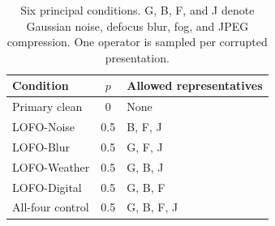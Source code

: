\begin{table}[!htbp]
\caption{Six principal conditions. G, B, F, and J denote Gaussian noise, defocus blur, fog, and JPEG compression. One operator is sampled per corrupted presentation.}
\label{tab:conditions}
\centering
\setlength{\tabcolsep}{8pt}
\begin{tabular}{lcl}
\toprule
Condition & $p$ & Allowed representatives \\
\midrule
Primary clean & 0 & None \\
LOFO-Noise & 0.5 & B, F, J \\
LOFO-Blur & 0.5 & G, F, J \\
LOFO-Weather & 0.5 & G, B, J \\
LOFO-Digital & 0.5 & G, B, F \\
All-four control & 0.5 & G, B, F, J \\
\bottomrule
\end{tabular}
\end{table}
